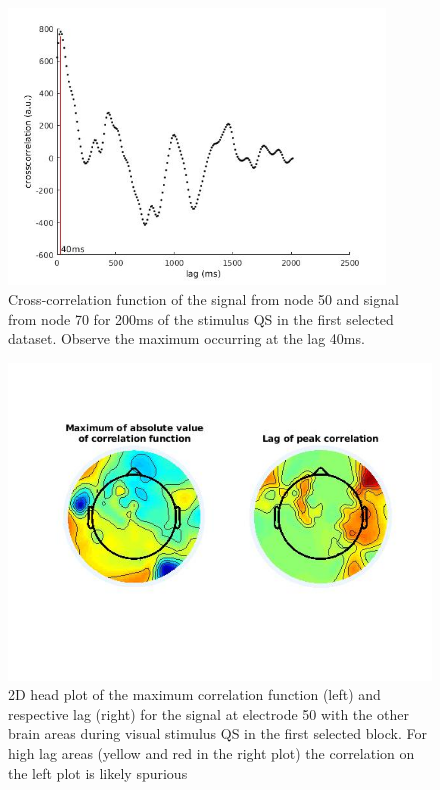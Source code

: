 \documentclass[a4paper]{article}
\begin{document}
\vspace{3cm}

\begin{figure}[H]
    \centering
    \includegraphics[width=10cm]{correlation.jpg}
    \caption{Cross-correlation function of the signal from node 50 and signal from node 70 for 200ms of the stimulus QS in the first selected dataset. Observe the maximum occurring at the lag 40ms.}
    \label{fig:xcorr}
\end{figure}

\newpage

\begin{figure}[H]
    \centering
    \includegraphics[width=13cm]{topoplot2.jpg}
    \caption{2D head plot of the maximum correlation function (left) and respective lag (right) for the signal at electrode 50 with the other brain areas during visual stimulus QS in the first selected block. For high lag areas (yellow and red in the right plot) the correlation on the left plot is likely spurious}
    \label{fig:topoplot2}
\end{figure}
\end{document}
